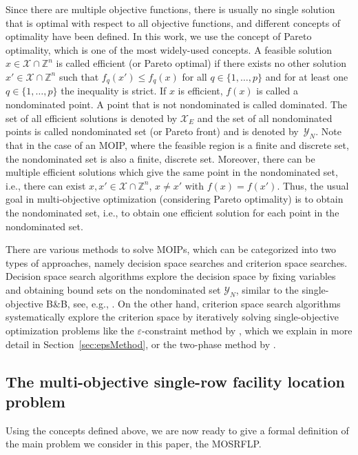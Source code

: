 \documentclass{article}
\newcommand{\BB}{B\&B\xspace}
\newcommand{\MOSRFLP}{MOSRFLP\xspace}
\begin{document}
Since there are multiple objective functions, there is usually no single solution that is optimal with respect to all objective functions, and different concepts of optimality have been defined. In this work, we use the
concept of Pareto optimality, which is one of the most widely-used concepts.
A feasible solution $x \in \mathcal{X} \cap \mathbb Z^n$ is called efficient (or Pareto optimal) if there 
exists no other solution $x ' \in \mathcal{X} \cap \mathbb Z^n$ such that $f_q(x ') \leq f_q(x )$ 
for all $q \in \{1, \dots, p\}$ and for at least one $q \in \{1, \dots, p\}$ the inequality is strict.
If $x$ is efficient, $f(x)$ is called a nondominated point. A point that is not nondominated is called dominated. The set of all efficient
solutions is denoted by $\mathcal{X}_E$ and the set of all nondominated points is called nondominated set (or Pareto front) and is denoted by~$\mathcal{Y}_N$. 
Note that in the case of an MOIP, where the feasible region is a finite and discrete set, the nondominated set is also a finite, discrete set. Moreover, there can be multiple efficient solutions which give the same point in the nondominated set, i.e., there can exist $x, x' \in \mathcal{X} \cap \mathbb Z^n$, $x \neq x'$ with $f(x)=f(x')$. Thus, the usual goal in multi-objective optimization (considering Pareto optimality) is to obtain the nondominated set, i.e., to obtain one efficient solution for each point in the nondominated set.

There are various methods to solve MOIPs, which can be categorized into two types of approaches, namely decision space searches and criterion space searches. Decision space search algorithms explore the decision space by fixing variables and obtaining bound sets on the nondominated set $\mathcal{Y}_N$, similar to the single-objective \BB, see, e.g., \citet{przybylski_multi-objective_2017}. On the other hand, criterion space search algorithms systematically explore the criterion space by iteratively solving single-objective optimization problems like the $\varepsilon$-constraint method by \citet{Haimes1971}, which we explain in more detail in Section~\ref{sec:epsMethod}, or the two-phase method by \citet{ULUNGU1995}. 

\subsection{The multi-objective single-row facility location problem}\label{sec:mo-srflp}
Using the concepts defined above, we are now ready to give a formal definition of the main problem we consider in this paper, the \MOSRFLP.
\end{document}
